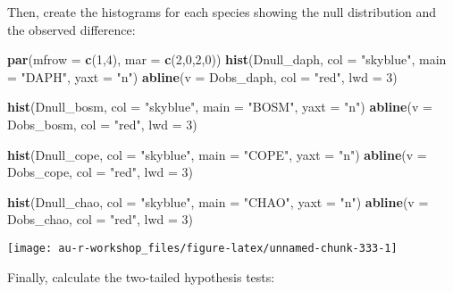 \documentclass[]{book}
\newenvironment{Shaded}{\begin{snugshade}}{\end{snugshade}}
\newcommand{\KeywordTok}[1]{\textcolor[rgb]{0.13,0.29,0.53}{\textbf{#1}}}
\newcommand{\DataTypeTok}[1]{\textcolor[rgb]{0.13,0.29,0.53}{#1}}
\newcommand{\DecValTok}[1]{\textcolor[rgb]{0.00,0.00,0.81}{#1}}
\newcommand{\StringTok}[1]{\textcolor[rgb]{0.31,0.60,0.02}{#1}}
\newcommand{\NormalTok}[1]{#1}
\theoremstyle{definition}
\theoremstyle{definition}
\theoremstyle{definition}
\theoremstyle{remark}
\begin{document}
Then, create the histograms for each species showing the null
distribution and the observed difference:

\begin{Shaded}
\begin{Highlighting}[]
\KeywordTok{par}\NormalTok{(}\DataTypeTok{mfrow =} \KeywordTok{c}\NormalTok{(}\DecValTok{1}\NormalTok{,}\DecValTok{4}\NormalTok{), }\DataTypeTok{mar =} \KeywordTok{c}\NormalTok{(}\DecValTok{2}\NormalTok{,}\DecValTok{0}\NormalTok{,}\DecValTok{2}\NormalTok{,}\DecValTok{0}\NormalTok{))}
\KeywordTok{hist}\NormalTok{(Dnull_daph, }\DataTypeTok{col =} \StringTok{"skyblue"}\NormalTok{, }\DataTypeTok{main =} \StringTok{"DAPH"}\NormalTok{, }\DataTypeTok{yaxt =} \StringTok{"n"}\NormalTok{)}
\KeywordTok{abline}\NormalTok{(}\DataTypeTok{v =}\NormalTok{ Dobs_daph, }\DataTypeTok{col =} \StringTok{"red"}\NormalTok{, }\DataTypeTok{lwd =} \DecValTok{3}\NormalTok{)}

\KeywordTok{hist}\NormalTok{(Dnull_bosm, }\DataTypeTok{col =} \StringTok{"skyblue"}\NormalTok{, }\DataTypeTok{main =} \StringTok{"BOSM"}\NormalTok{, }\DataTypeTok{yaxt =} \StringTok{"n"}\NormalTok{)}
\KeywordTok{abline}\NormalTok{(}\DataTypeTok{v =}\NormalTok{ Dobs_bosm, }\DataTypeTok{col =} \StringTok{"red"}\NormalTok{, }\DataTypeTok{lwd =} \DecValTok{3}\NormalTok{)}

\KeywordTok{hist}\NormalTok{(Dnull_cope, }\DataTypeTok{col =} \StringTok{"skyblue"}\NormalTok{, }\DataTypeTok{main =} \StringTok{"COPE"}\NormalTok{, }\DataTypeTok{yaxt =} \StringTok{"n"}\NormalTok{)}
\KeywordTok{abline}\NormalTok{(}\DataTypeTok{v =}\NormalTok{ Dobs_cope, }\DataTypeTok{col =} \StringTok{"red"}\NormalTok{, }\DataTypeTok{lwd =} \DecValTok{3}\NormalTok{)}

\KeywordTok{hist}\NormalTok{(Dnull_chao, }\DataTypeTok{col =} \StringTok{"skyblue"}\NormalTok{, }\DataTypeTok{main =} \StringTok{"CHAO"}\NormalTok{, }\DataTypeTok{yaxt =} \StringTok{"n"}\NormalTok{)}
\KeywordTok{abline}\NormalTok{(}\DataTypeTok{v =}\NormalTok{ Dobs_chao, }\DataTypeTok{col =} \StringTok{"red"}\NormalTok{, }\DataTypeTok{lwd =} \DecValTok{3}\NormalTok{)}
\end{Highlighting}
\end{Shaded}

\begin{center}\texttt{[image: au-r-workshop\_files/figure-latex/unnamed-chunk-333-1]} \end{center}

Finally, calculate the two-tailed hypothesis tests:
\end{document}
